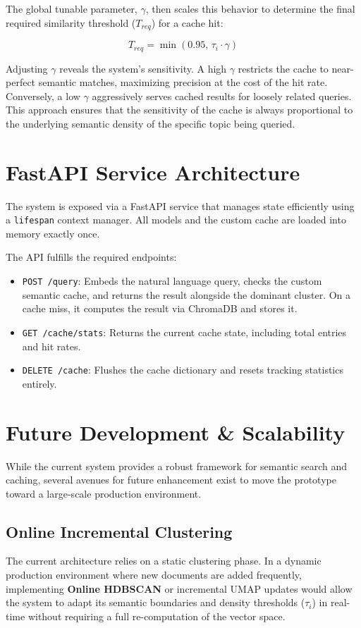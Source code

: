 \documentclass[11pt,a4paper]{article}
\begin{document}
The global tunable parameter, $\gamma$, then scales this behavior to determine the final required similarity threshold ($T_{req}$) for a cache hit:

\begin{equation}
    T_{req} = \min(0.95, \, \tau_i \cdot \gamma)
\end{equation}

Adjusting $\gamma$ reveals the system's sensitivity. A high $\gamma$ restricts the cache to near-perfect semantic matches, maximizing precision at the cost of the hit rate. Conversely, a low $\gamma$ aggressively serves cached results for loosely related queries. This approach ensures that the sensitivity of the cache is always proportional to the underlying semantic density of the specific topic being queried.
\section{FastAPI Service Architecture}
The system is exposed via a FastAPI service that manages state efficiently using a \texttt{lifespan} context manager. All models and the custom cache are loaded into memory exactly once. 

The API fulfills the required endpoints:
\begin{itemize}
    \item \texttt{POST /query}: Embeds the natural language query, checks the custom semantic cache, and returns the result alongside the dominant cluster. On a cache miss, it computes the result via ChromaDB and stores it.
    \item \texttt{GET /cache/stats}: Returns the current cache state, including total entries and hit rates.
    \item \texttt{DELETE /cache}: Flushes the cache dictionary and resets tracking statistics entirely.
\end{itemize}

\section{Future Development \& Scalability}
While the current system provides a robust framework for semantic search and caching, several avenues for future enhancement exist to move the prototype toward a large-scale production environment.

\subsection{Online Incremental Clustering}
The current architecture relies on a static clustering phase. In a dynamic production environment where new documents are added frequently, implementing \textbf{Online HDBSCAN} or incremental UMAP updates would allow the system to adapt its semantic boundaries and density thresholds ($\tau_i$) in real-time without requiring a full re-computation of the vector space.
\end{document}
